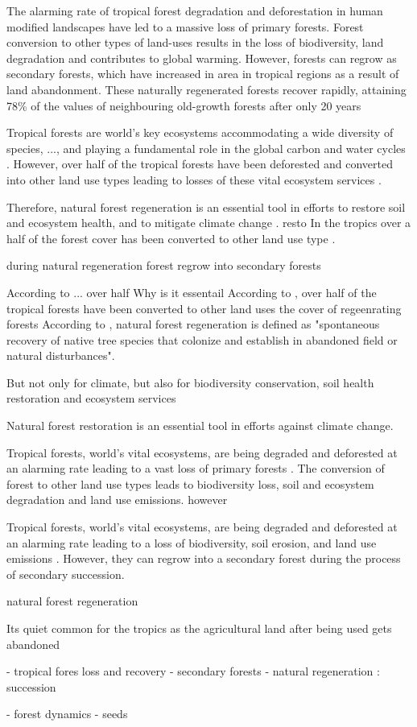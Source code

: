 
The alarming rate of tropical forest degradation and deforestation in human modified landscapes
have led to a massive loss of primary forests. Forest conversion to other types of land-uses results in
the loss of biodiversity, land degradation and contributes to global warming. However, forests can
regrow as secondary forests, which have increased in area in tropical regions as a result of land
abandonment. These naturally regenerated forests recover rapidly, attaining 78\% of the values of
neighbouring old-growth forests after only 20 years


Tropical forests are world's key ecosystems accommodating a wide diversity of species, ..., and playing a fundamental role in the global carbon and water cycles \citep{bormaCarbonContributionsSouth2022}. However, over half of the tropical forests have been deforested and converted into other land use types leading to losses of these vital ecosystem services \citep{chazdonNaturalRegenerationTool2016}. 

Therefore, natural forest regeneration is an essential tool in efforts to restore soil and ecosystem health, and to mitigate climate change \citep{hordijkLandUseHistory2024}.  resto In the tropics over a half of the forest cover has been converted to other land use type \citep{chazdonNaturalRegenerationTool2016}.

during natural regeneration forest regrow into secondary forests

According to ... over half Why is it essentail According to \citet{chazdonNaturalRegenerationTool2016}, over half of the tropical forests have been converted to other land uses the cover of regeenrating forests
According to \citet{crouzeillesEcologicalRestorationSuccess2017}, natural forest regeneration is defined as "spontaneous recovery of native tree species that colonize and establish in abandoned field or natural disturbances".

But not only for climate, but also for biodiversity conservation, soil health restoration and ecosystem services

Natural forest restoration is an essential tool in efforts against climate change.

Tropical forests, world's vital ecosystems, are being degraded and deforested at an alarming rate leading to a vast loss of primary forests \citep{lopez-bedoyaPrimaryForestLoss2022}. The conversion of forest to other land use types leads to biodiversity loss, soil and ecosystem degradation and land use emissions. however

Tropical forests, world's vital ecosystems, are being degraded and deforested at an alarming rate leading to a loss of biodiversity, soil erosion, and land use emissions \citep{lopez-bedoyaPrimaryForestLoss2022}. However, they can regrow into a secondary forest during the process of secondary succession. 

natural forest regeneration 

Its quiet common for the tropics as the agricultural land after being used gets abandoned

- tropical fores loss and recovery
- secondary forests
- natural regeneration : succession

- forest dynamics
- seeds